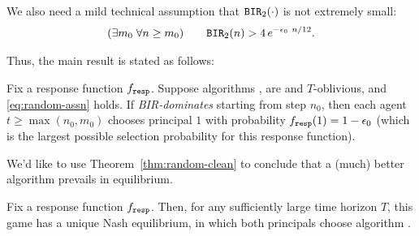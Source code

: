 We also need a mild technical assumption that $\mathtt{BIR}_2(\cdot)$ is not extremely small:
\begin{align}\label{eq:random-assn}
 (\exists m_0\;\forall n\geq m_0) \qquad
  \mathtt{BIR}_2(n) > 4\,e^{-\epsilon_0\ n/12}.
\end{align}

Thus, the main result is stated as follows:

\begin{theorem}\label{thm:random-clean}
Fix a \HardMaxRandom response function $f_{\mathtt{resp}}$. Suppose algorithms \alg[1], \alg[2] are \bmonotone and $T$-oblivious, and \eqref{eq:random-assn} holds. If \alg[1] \emph{BIR-dominates} \alg[2] starting from step $n_0$, then each agent $t\geq \max(n_0,m_0)$ chooses principal $1$ with probability $f_{\mathtt{resp}}(1) = 1- \epsilon_0$ (which is the largest possible selection probability for this response function).
\end{theorem}






We'd like to use Theorem~\ref{thm:random-clean} to conclude that a (much) better algorithm prevails in equilibrium. 


\begin{corollary}\label{cor:random}
Fix a \HardMaxRandom response function $f_{\mathtt{resp}}$.  Then, for any sufficiently large time horizon $T$, this game has a unique Nash equilibrium, in which both principals choose algorithm \alg.
\end{corollary}


